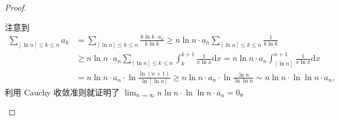 \documentclass[../../main.tex]{subfiles}
\begin{document}
\begin{proof}
\begin{enumerate}
注意到
\begin{align*}
\sum_{[\ln n] \leqslant k \leqslant n} a_k &= \sum_{[\ln n] \leqslant k \leqslant n} \frac{k \ln k \cdot a_k}{k \ln k} \geqslant n \ln n \cdot a_n \sum_{[\ln n] \leqslant k \leqslant n} \frac{1}{k \ln k} \\
&\geqslant n \ln n \cdot a_n \sum_{[\ln n] \leqslant k \leqslant n} \int_{k}^{k + 1} \frac{1}{x \ln x} \mathrm{d}x = n \ln n \cdot a_n \int_{[\ln n]}^{n + 1} \frac{1}{x \ln x} \mathrm{d}x \\
&= n \ln n \cdot a_n \cdot \ln \frac{\ln (n + 1)}{\ln [\ln n]} \geqslant n \ln n \cdot a_n \cdot \ln \frac{\ln n}{\ln \ln n} \sim n \ln n \cdot \ln \ln n \cdot a_n,
\end{align*}
利用 Cauchy 收敛准则就证明了 \( \lim_{n \to \infty} n \ln n \cdot \ln \ln n \cdot a_n = 0 \)。
\end{enumerate}
\end{proof}
\end{document}
